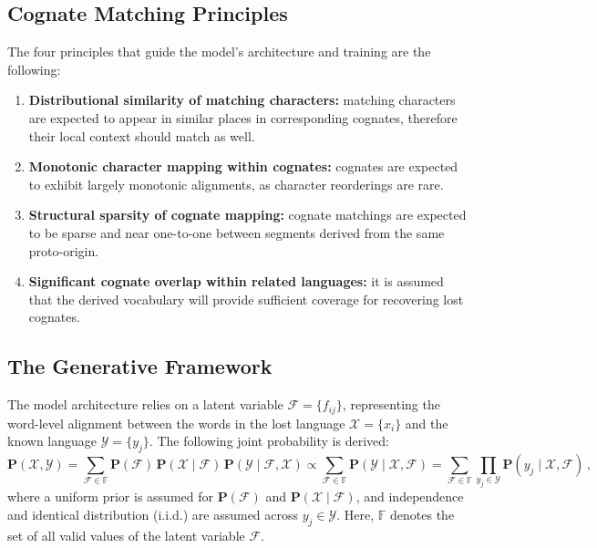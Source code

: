 \subsection{Cognate Matching Principles}
The four principles that guide the model's architecture and training are the following:
\begin{enumerate}[leftmargin=2em, label=\textbf{\arabic*.}]
    \item \textbf{Distributional similarity of matching characters:}
    matching characters are expected to appear in similar places in corresponding cognates, therefore their local context should match as well.

    \item \textbf{Monotonic character mapping within cognates:}
    cognates are expected to exhibit largely monotonic alignments, as character reorderings are rare.

    \item \textbf{Structural sparsity of cognate mapping:}
    cognate matchings are expected to be sparse and near one-to-one between segments derived from the same proto-origin.

    \item \textbf{Significant cognate overlap within related languages:}
    it is assumed that the derived vocabulary will provide sufficient coverage for recovering lost cognates.
\end{enumerate}

\subsection{The Generative Framework}
The model architecture relies on a latent variable $\mathcal{F}=\{f_{ij}\}$, representing the word-level alignment between the words in the lost language $\mathcal{X}=\{x_i\}$ and the known language $\mathcal{Y}=\{y_j\}$.
The following joint probability is derived:
\[
\mathbf{P}(\mathcal{X}, \mathcal{Y})
= \sum_{\mathcal{F}\in \mathbb{F}}
  \mathbf{P}(\mathcal{F})\,\mathbf{P}(\mathcal{X}\mid \mathcal{F})\,\mathbf{P}(\mathcal{Y}\mid \mathcal{F}, \mathcal{X})
\propto
\sum_{\mathcal{F}\in \mathbb{F}}
  \mathbf{P}(\mathcal{Y}\mid \mathcal{X}, \mathcal{F})
=
\sum_{\mathcal{F}\in \mathbb{F}}
  \prod_{y_j\in \mathcal{Y}}
  \mathbf{P}(y_j \mid \mathcal{X}, \mathcal{F}) \, ,
\]
where a uniform prior is assumed for $\mathbf{P}(\mathcal{F})$ and $\mathbf{P}(\mathcal{X}\mid \mathcal{F})$, and independence and identical distribution (i.i.d.) are assumed across $y_j\in\mathcal{Y}$.
Here, $\mathbb{F}$ denotes the set of all valid values of the latent variable $\mathcal{F}$.

